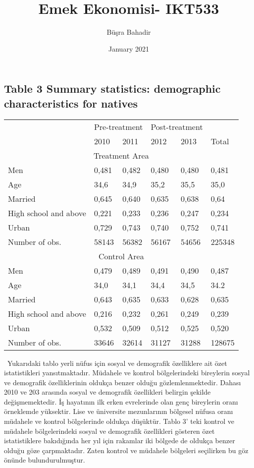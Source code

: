 \documentclass{article}
\title{Emek Ekonomisi- IKT533}
\author{Büşra Bahadir }
\date{January 2021}
\begin{document}
\maketitle
        \begin{table}[h]
            \subsection*{Table 3 Summary statistics: demographic characteristics for natives}
            \begin{tabular}{|llllll|}
            \hline
                 & \multicolumn{2}{|c|}{Pre-treatment} & \multicolumn{2}{|c|}{Post-treatment} &\\
                 & 2010 & 2011 & 2012 & 2013 & Total \\ \hline
                \multicolumn{6}{|c|}{Treatment Area}\\ \hline
                Men  & 0,481 & 0,482 & 0,480 & 0,480 & 0,481 \\ 
               Age & 34,6 & 34,9 & 35,2 & 35,5 & 35,0 \\ 
               Married & 0,645 & 0,640 & 0,635 & 0,638 & 0,64 \\ 
               High school and above & 0,221 & 0,233 & 0,236 & 0,247 & 0,234 \\ 
                Urban & 0,729 & 0,743 & 0,740 & 0,752 & 0,741 \\ 
                Number of obs. & 58143 & 56382 & 56167 & 54656 & 225348 \\ \hline 
                \multicolumn{6}{|c|}{Control Area}\\ \hline
                Men  & 0,479 & 0,489 & 0,491 & 0,490 & 0,487 \\
                Age & 34,0 & 34,1 & 34,4 & 34,5 & 34.2 \\ 
               Married & 0,643 & 0,635 & 0,633 & 0,628 & 0,635 \\ 
               High school and above & 0,216 & 0,232 & 0,261 & 0,249 & 0,239 \\ 
                Urban& 0,532 & 0,509 & 0,512 & 0,525 & 0,520 \\ 
                Number of obs. & 33646 & 32614 & 31127 & 31288 & 128675 \\ \hline
            \end{tabular}
        \end{table}
\
Yukarıdaki tablo yerli nüfus için sosyal ve demografik özelliklere ait özet istatistikleri yansıtmaktadır. Müdahele ve kontrol bölgelerindeki bireylerin sosyal ve demografik özelliklerinin oldukça benzer olduğu gözlemlenmektedir. Dahası 2010 ve 203 arasında sosyal ve demografik özellikleri belirgin şekilde değişmemektedir. İş hayatının ilk erken evrelerinde olan genç bireylerin oranı örneklemde yüksektir. Lise ve üniversite mezunlarının bölgesel nüfusa oranı müdahele ve kontrol bölgelerinde oldukça düşüktür. Tablo 3’ teki kontrol ve müdahele bölgelerindeki sosyal ve demografik özellikleri gösteren özet istatistiklere bakıdığında her yıl için rakamlar iki bölgede de oldukça benzer olduğu göze çarpmaktadır. Zaten kontrol ve müdahele bölgeleri seçilirken bu göz önünde bulundurulmuştur.
\end{document}
